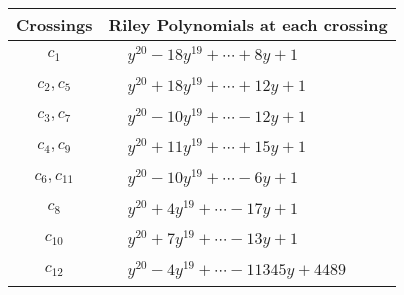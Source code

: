 \documentclass[1p]{elsarticle_modified}
\theoremstyle{definition}
\begin{document}
\begin{tabular}{m{50pt}|m{274pt}}
Crossings & \hspace{64pt}Riley Polynomials at each crossing \\
\hline $$\begin{aligned}c_{1}\end{aligned}$$&$\begin{aligned}
&y^{20}-18 y^{19}+\cdots+8 y+1
\end{aligned}$\\
\hline $$\begin{aligned}c_{2},c_{5}\end{aligned}$$&$\begin{aligned}
&y^{20}+18 y^{19}+\cdots+12 y+1
\end{aligned}$\\
\hline $$\begin{aligned}c_{3},c_{7}\end{aligned}$$&$\begin{aligned}
&y^{20}-10 y^{19}+\cdots-12 y+1
\end{aligned}$\\
\hline $$\begin{aligned}c_{4},c_{9}\end{aligned}$$&$\begin{aligned}
&y^{20}+11 y^{19}+\cdots+15 y+1
\end{aligned}$\\
\hline $$\begin{aligned}c_{6},c_{11}\end{aligned}$$&$\begin{aligned}
&y^{20}-10 y^{19}+\cdots-6 y+1
\end{aligned}$\\
\hline $$\begin{aligned}c_{8}\end{aligned}$$&$\begin{aligned}
&y^{20}+4 y^{19}+\cdots-17 y+1
\end{aligned}$\\
\hline $$\begin{aligned}c_{10}\end{aligned}$$&$\begin{aligned}
&y^{20}+7 y^{19}+\cdots-13 y+1
\end{aligned}$\\
\hline $$\begin{aligned}c_{12}\end{aligned}$$&$\begin{aligned}
&y^{20}-4 y^{19}+\cdots-11345 y+4489
\end{aligned}$\\
\hline
\end{tabular}\\~\\
\end{document}
